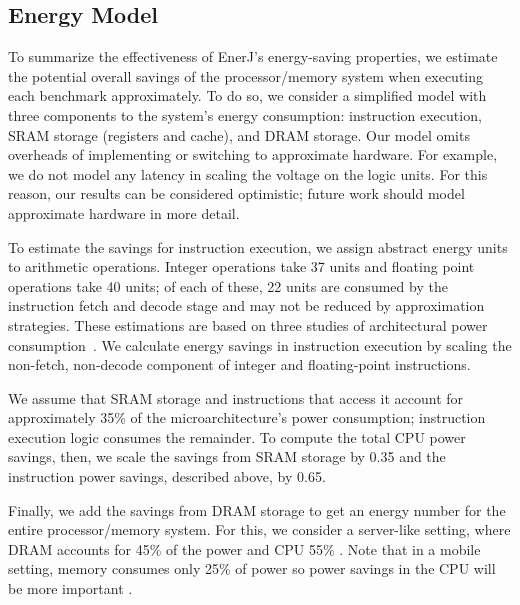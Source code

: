 \subsection{Energy Model}
\label{energymodel}
To summarize the effectiveness of EnerJ's energy-saving properties, we estimate
the potential overall savings of the processor/memory system when executing
each benchmark approximately. To do so, we consider a simplified model with
three components to the system's energy consumption: instruction execution,
SRAM storage (registers and cache), and DRAM storage.
Our model omits overheads of implementing or switching to approximate hardware.
For example, we do not model any latency in scaling the voltage on the logic
units. For this reason, our results can be considered optimistic; future work
should model approximate hardware in more detail.

To estimate the savings for instruction execution, we assign abstract energy
units to arithmetic operations. Integer operations take 37 units and floating point
operations take 40 units; of each of these, 22 units are consumed by the
instruction fetch and decode stage and may not be reduced by approximation
strategies. These estimations are based on three studies of architectural
power consumption~\cite{mcpat,burger2003,wattch}.
We calculate energy savings in instruction execution by scaling the
non-fetch, non-decode component of integer and floating-point instructions.

We assume that SRAM storage and instructions that access it account
for approximately 35\% of the microarchitecture's power consumption;
instruction execution logic consumes the remainder. To compute the
total CPU power savings, then, we scale the savings from SRAM storage
by 0.35 and the instruction power savings, described above, by 0.65.

Finally, we add the savings from DRAM storage to get an energy number for the
entire processor/memory system. For this, we consider a server-like setting,
where DRAM accounts for 45\% of the power and CPU 55\% \cite{googlepower}. Note
that in a mobile setting, memory consumes only 25\% of power so power savings in
the CPU will be more important \cite{carroll2010}.

